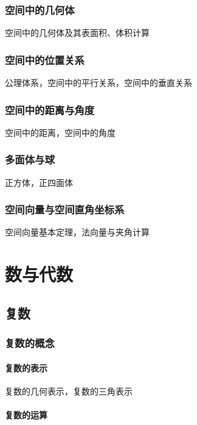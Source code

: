 \documentclass[lang=cn, zihao=5]{elegantbook}
\begin{document}
\section{空间中的几何体}

空间中的几何体及其表面积、体积计算

\section{空间中的位置关系}

公理体系，空间中的平行关系，空间中的垂直关系

\section{空间中的距离与角度}

空间中的距离，空间中的角度

\section{多面体与球}

正方体，正四面体

\section{空间向量与空间直角坐标系}

空间向量基本定理，法向量与夹角计算





\part{数与代数}

\chapter{复数}

\section{复数的概念}

\subsection{复数的表示}

复数的几何表示，复数的三角表示

\subsection{复数的运算}
\end{document}
